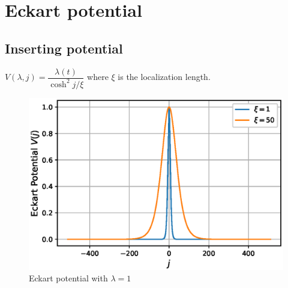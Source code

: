 \documentclass[11pt,a4paper]{article}
\begin{document}
\section{Eckart potential}

\subsection{Inserting potential}
$V(\lambda,j) =\dfrac{ \lambda(t)}{\cosh^2 j/ \xi}$ where $\xi$ is the localization length.


\begin{figure}[!ht]
\begin{center}
\includegraphics[scale=0.68]{pics/eckart_potn.eps}
\caption{Eckart potential with $\lambda=1$ }
\end{center}
\end{figure}
\end{document}
